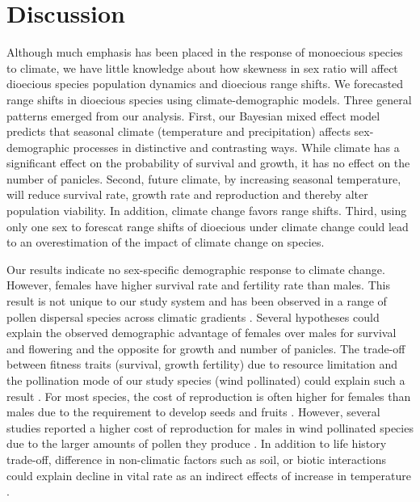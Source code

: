 \documentclass[12pt]{article}
\begin{document}
\section*{Discussion}
Although much emphasis has been placed in the response of monoecious species to climate, we have little knowledge about how skewness in sex ratio will affect dioecious species population dynamics and dioecious range shifts. 
We forecasted range shifts in dioecious species using climate-demographic models. 
Three general patterns emerged from our analysis.
First, our Bayesian mixed effect model predicts that seasonal climate (temperature and precipitation) affects sex-demographic processes in distinctive and contrasting ways.
While climate has a significant effect on the probability of survival and growth, it has no effect on the number of panicles. 
Second, future climate, by increasing seasonal temperature, will reduce survival rate, growth rate and reproduction and thereby alter population viability.
In addition, climate change favors range shifts. 
Third, using only one sex to forescat range shifts of dioecious under climate change could lead to an overestimation of the impact of  climate change on species.

Our results indicate no sex-specific demographic response to climate change. 
However, females have higher survival rate and fertility rate than males. 
This result is not unique to our study system and has been observed in a range of pollen dispersal species across climatic gradients \citep{welbergen2008climate,zhao2012sex,sasaki2019complex}. 
Several hypotheses could explain the observed demographic advantage of females over males for survival and flowering and the opposite for growth and number of panicles.
The trade-off between fitness traits (survival, growth fertility) due to resource limitation and the pollination mode of our study species (wind pollinated) could explain such a result \citep{cipollini1994sexual,freeman1976differential}.
For most species, the cost of reproduction is often higher for females than males due to the requirement to develop seeds and fruits \citep{hultine2016climate}. 
However, several studies reported a higher cost of reproduction for males in wind pollinated species due to the larger amounts of pollen they produce \citep{burli2022environmental,cipollini1994sexual,bruijning2017surviving,field2013comparative}.
In addition to life history trade-off, difference in non-climatic factors such as soil, or biotic interactions could explain decline in vital rate as an indirect effects of increase in temperature \citep{alexander2015novel,schultz2022climate}.
\end{document}
